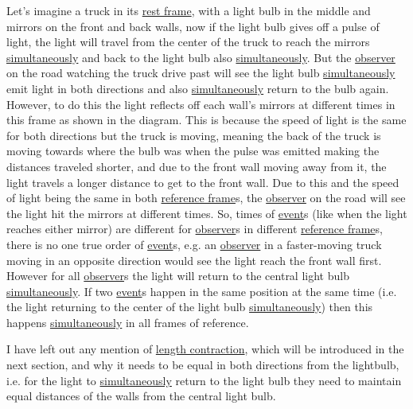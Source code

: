 Let's imagine a truck in its \hyperlink{def-proper-frame}{rest frame}, with a light bulb in the middle and mirrors on the front and back walls, now if the light bulb gives off a pulse of light, the light will travel from the center of the truck to reach the mirrors \hyperlink{def-simultaneity}{simultaneously} and back to the light bulb also \hyperlink{def-simultaneity}{simultaneously}.
But the \hyperlink{def-observer}{observer} on the road watching the truck drive past will see the light bulb \hyperlink{def-simultaneity}{simultaneously} emit light in both directions and also \hyperlink{def-simultaneity}{simultaneously} return to the bulb again. However, to do this the light reflects off each wall's mirrors at different times in this frame as shown in the diagram. This is because the speed of light is the same for both directions but the truck is moving, meaning the back of the truck is moving towards where the bulb was when the pulse was emitted making the distances traveled shorter, and due to the front wall moving away from it, the light travels a longer distance to get to the front wall. Due to this and the speed of light being the same in both \hyperlink{def-Reference-frame}{reference frame}s, the \hyperlink{def-observer}{observer} on the road will see the light hit the mirrors at different times.
So, times of \hyperlink{def-event}{event}s (like when the light reaches either mirror) are different for \hyperlink{def-observer}{observer}s in different \hyperlink{def-Reference-frame}{reference frame}s, there is no one true order of \hyperlink{def-event}{event}s, e.g. an \hyperlink{def-observer}{observer} in a faster-moving truck moving in an opposite direction would see the light reach the front wall first.
However for all \hyperlink{def-observer}{observer}s the light will return to the central light bulb \hyperlink{def-simultaneity}{simultaneously}. If two \hyperlink{def-event}{event}s happen in the same position at the same time (i.e. the light returning to the center of the light bulb \hyperlink{def-simultaneity}{simultaneously}) then this happens \hyperlink{def-simultaneity}{simultaneously} in all frames of reference.

I have left out any mention of \hyperlink{def-length-contraction}{length contraction}, which will be introduced in the next section, and why it needs to be equal in both directions from the lightbulb, i.e. for the light to \hyperlink{def-simultaneity}{simultaneously} return to the light bulb they need to maintain equal distances of the walls from the central light bulb.

